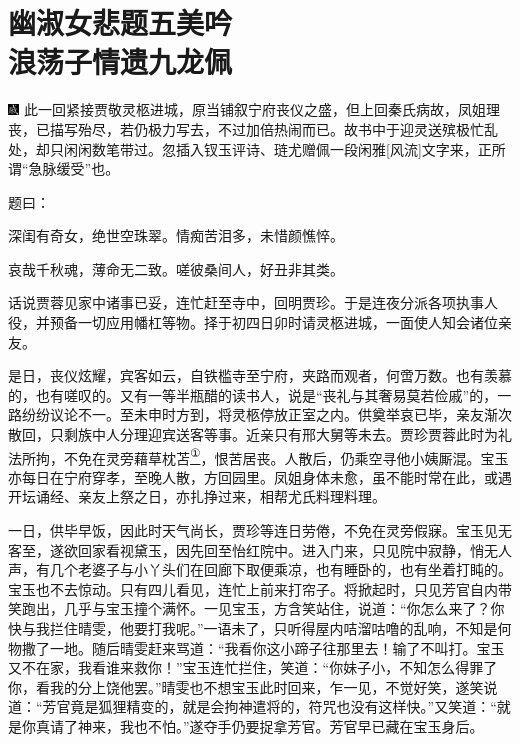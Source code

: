 

\chapter{幽淑女悲题五美吟\\浪荡子情遗九龙佩}

{\includegraphics[width=3mm]{../Images/00005} \kaishu 此一回紧接贾敬灵柩进城，原当铺叙宁府丧仪之盛，但上回秦氏病故，凤姐理丧，已描写殆尽，若仍极力写去，不过加倍热闹而已。故书中于迎灵送殡极忙乱处，却只闲闲数笔带过。忽插入钗玉评诗、琏尤赠佩一段闲雅{[}风流{]}文字来，正所谓``急脉缓受''也。}

题曰：

深闺有奇女，绝世空珠翠。情痴苦泪多，未惜颜憔悴。

哀哉千秋魂，薄命无二致。嗟彼桑间人，好丑非其类。

话说贾蓉见家中诸事已妥，连忙赶至寺中，回明贾珍。于是连夜分派各项执事人役，并预备一切应用幡杠等物。择于初四日卯时请灵柩进城，一面使人知会诸位亲友。

是日，丧仪炫耀，宾客如云，自铁槛寺至宁府，夹路而观者，何啻万数。也有羡慕的，也有嗟叹的。又有一等半瓶醋的读书人，说是``丧礼与其奢易莫若俭戚''的，一路纷纷议论不一。至未申时方到，将灵柩停放正室之内。供奠举哀已毕，亲友渐次散回，只剩族中人分理迎宾送客等事。近亲只有邢大舅等未去。贾珍贾蓉此时为礼法所拘，不免在灵旁藉草枕苫\href{../Text/part0068_split_000.html\#lnkback_1_a}{\textsuperscript{①}}，恨苦居丧。人散后，仍乘空寻他小姨厮混。宝玉亦每日在宁府穿孝，至晚人散，方回园里。凤姐身体未愈，虽不能时常在此，或遇开坛诵经、亲友上祭之日，亦扎挣过来，相帮尤氏料理料理。

一日，供毕早饭，因此时天气尚长，贾珍等连日劳倦，不免在灵旁假寐。宝玉见无客至，遂欲回家看视黛玉，因先回至怡红院中。进入门来，只见院中寂静，悄无人声，有几个老婆子与小丫头们在回廊下取便乘凉，也有睡卧的，也有坐着打盹的。宝玉也不去惊动。只有四儿看见，连忙上前来打帘子。将掀起时，只见芳官自内带笑跑出，几乎与宝玉撞个满怀。一见宝玉，方含笑站住，说道：``你怎么来了？你快与我拦住晴雯，他要打我呢。''一语未了，只听得屋内咭溜咕噜的乱响，不知是何物撒了一地。随后晴雯赶来骂道：``我看你这小蹄子往那里去！输了不叫打。宝玉又不在家，我看谁来救你！''宝玉连忙拦住，笑道：``你妹子小，不知怎么得罪了你，看我的分上饶他罢。''晴雯也不想宝玉此时回来，乍一见，不觉好笑，遂笑说道：``芳官竟是狐狸精变的，就是会拘神遣将的，符咒也没有这样快。''又笑道：``就是你真请了神来，我也不怕。''遂夺手仍要捉拿芳官。芳官早已藏在宝玉身后。

